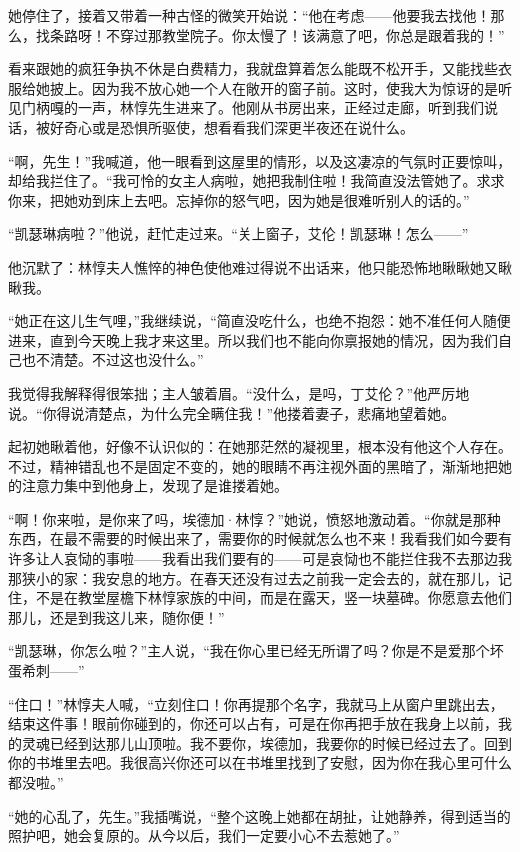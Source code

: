 \par 她停住了，接着又带着一种古怪的微笑开始说：“他在考虑——他要我去找他！那么，找条路呀！不穿过那教堂院子。你太慢了！该满意了吧，你总是跟着我的！”
\par 看来跟她的疯狂争执不休是白费精力，我就盘算着怎么能既不松开手，又能找些衣服给她披上。因为我不放心她一个人在敞开的窗子前。这时，使我大为惊讶的是听见门柄嘎的一声，林惇先生进来了。他刚从书房出来，正经过走廊，听到我们说话，被好奇心或是恐惧所驱使，想看看我们深更半夜还在说什么。
\par “啊，先生！”我喊道，他一眼看到这屋里的情形，以及这凄凉的气氛时正要惊叫，却给我拦住了。“我可怜的女主人病啦，她把我制住啦！我简直没法管她了。求求你来，把她劝到床上去吧。忘掉你的怒气吧，因为她是很难听别人的话的。”
\par “凯瑟琳病啦？”他说，赶忙走过来。“关上窗子，艾伦！凯瑟琳！怎么——”
\par 他沉默了：林惇夫人憔悴的神色使他难过得说不出话来，他只能恐怖地瞅瞅她又瞅瞅我。
\par “她正在这儿生气哩，”我继续说，“简直没吃什么，也绝不抱怨：她不准任何人随便进来，直到今天晚上我才来这里。所以我们也不能向你禀报她的情况，因为我们自己也不清楚。不过这也没什么。”
\par 我觉得我解释得很笨拙；主人皱着眉。“没什么，是吗，丁艾伦？”他严厉地说。“你得说清楚点，为什么完全瞒住我！”他搂着妻子，悲痛地望着她。
\par 起初她瞅着他，好像不认识似的：在她那茫然的凝视里，根本没有他这个人存在。不过，精神错乱也不是固定不变的，她的眼睛不再注视外面的黑暗了，渐渐地把她的注意力集中到他身上，发现了是谁搂着她。
\par “啊！你来啦，是你来了吗，埃德加·林惇？”她说，愤怒地激动着。“你就是那种东西，在最不需要的时候出来了，需要你的时候就怎么也不来！我看我们如今要有许多让人哀恸的事啦——我看出我们要有的——可是哀恸也不能拦住我不去那边我那狭小的家：我安息的地方。在春天还没有过去之前我一定会去的，就在那儿，记住，不是在教堂屋檐下林惇家族的中间，而是在露天，竖一块墓碑。你愿意去他们那儿，还是到我这儿来，随你便！”
\par “凯瑟琳，你怎么啦？”主人说，“我在你心里已经无所谓了吗？你是不是爱那个坏蛋希刺——”
\par “住口！”林惇夫人喊，“立刻住口！你再提那个名字，我就马上从窗户里跳出去，结束这件事！眼前你碰到的，你还可以占有，可是在你再把手放在我身上以前，我的灵魂已经到达那儿山顶啦。我不要你，埃德加，我要你的时候已经过去了。回到你的书堆里去吧。我很高兴你还可以在书堆里找到了安慰，因为你在我心里可什么都没啦。”
\par “她的心乱了，先生。”我插嘴说，“整个这晚上她都在胡扯，让她静养，得到适当的照护吧，她会复原的。从今以后，我们一定要小心不去惹她了。”
